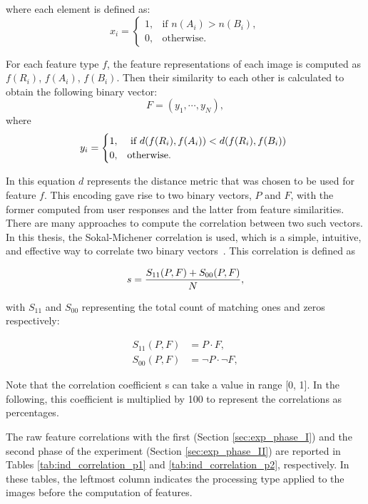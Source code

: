 where each element is defined as:
\begin{equation}
x_i = \begin{cases}
1, &\text{if $n(A_i) > n(B_i)$}, \\
0, &\text{otherwise}.
\end{cases}
\end{equation}

For each feature type $f$, the feature representations of each image is computed as $f(R_i)$, $f(A_i)$, $f(B_i)$. Then their similarity to each other is calculated to obtain the following binary vector:
\begin{equation}
    F = (y_1,\cdots, y_N ),
\end{equation}
where
\begin{equation}
y_i = \begin{cases}
1, &\text{ if $ d(f(R_i), f(A_i)) < d(f(R_i), f(B_i))$ } \\
0, &\text{otherwise}.
\end{cases}
\end{equation}

In this equation $d$ represents the distance metric that was chosen to be used for feature $f$. This encoding gave rise to two binary vectors, $P$ and $F$, with the former computed from user responses and the latter from feature similarities. There are many approaches to compute the correlation between two such vectors. In this thesis, the Sokal-Michener correlation is used, which is a simple, intuitive, and effective way to correlate two binary vectors~\cite{zhang2003properties}. This correlation is defined as

\begin{equation}
s = {{S_{11}(P, F) + S_{00}(P, F)} \over {N}},
\end{equation}

with $S_{11}$ and $S_{00}$ representing the total count of matching ones and zeros respectively:

\begin{align}
    S_{11}(P, F) &= P \cdot F,\\
    S_{00}(P, F) &= \neg P \cdot \neg F, 
\end{align}


Note that the correlation coefficient s can take a value in range [0, 1]. In the following, this coefficient is multiplied by 100 to represent the correlations as percentages.

The raw feature correlations with the first (Section \ref{sec:exp_phase_I}) and the second phase of the experiment (Section \ref{sec:exp_phase_II}) are reported in Tables \ref{tab:ind_correlation_p1} and \ref{tab:ind_correlation_p2}, respectively. In these tables, the leftmost column indicates the processing type applied to the images before the computation of features.

